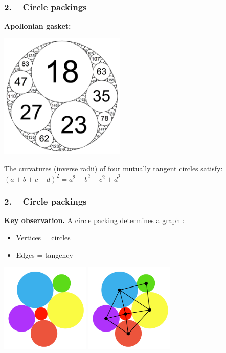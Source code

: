 \begin{frame}
\frametitle{2. ~ Circle packings}



{\bfseries Apollonian gasket:}

\begin{center}
\includegraphics[width=170pt]{images/ApollonianGasket.png}
\end{center}

The curvatures (inverse radii) of four mutually tangent circles satisfy:
$(a + b + c + d)^2 = a^2 + b^2 + c^2 + d^2 $

\end{frame}



\begin{frame}
\frametitle{2. ~ Circle packings}



{\bfseries Key observation.} A circle packing determines a graph :
\begin{itemize}[$\bullet$]
 \item Vertices = circles
 \item Edges = tangency
\end{itemize}

\bigskip \pause

\begin{center}
\includegraphics[width=120pt]{images/CP8b.png} \hspace{20pt}
\includegraphics[width=120pt]{images/CP8c.pdf}
\end{center}

\end{frame}



